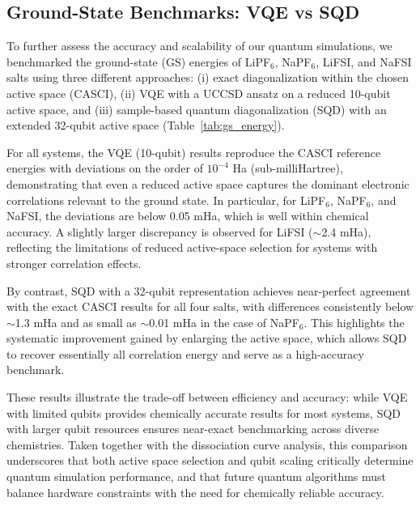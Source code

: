 \documentclass[num-refs]{wiley-article}
\begin{document}
\subsection{Ground-State Benchmarks: VQE vs SQD}

To further assess the accuracy and scalability of our quantum simulations, we benchmarked the ground-state (GS) energies of LiPF$_6$, NaPF$_6$, LiFSI, and NaFSI salts using three different approaches: (i) exact diagonalization within the chosen active space (CASCI), (ii) VQE with a UCCSD ansatz on a reduced 10-qubit active space, and (iii) sample-based quantum diagonalization (SQD) with an extended 32-qubit active space (Table~\ref{tab:gs_energy}).

For all systems, the VQE (10-qubit) results reproduce the CASCI reference energies with deviations on the order of $10^{-4}$ Ha (sub-milliHartree), demonstrating that even a reduced active space captures the dominant electronic correlations relevant to the ground state. In particular, for LiPF$_6$, NaPF$_6$, and NaFSI, the deviations are below 0.05 mHa, which is well within chemical accuracy. A slightly larger discrepancy is observed for LiFSI ($\sim$2.4 mHa), reflecting the limitations of reduced active-space selection for systems with stronger correlation effects.

By contrast, SQD with a 32-qubit representation achieves near-perfect agreement with the exact CASCI results for all four salts, with differences consistently below $\sim$1.3 mHa and as small as $\sim$0.01 mHa in the case of NaPF$_6$. This highlights the systematic improvement gained by enlarging the active space, which allows SQD to recover essentially all correlation energy and serve as a high-accuracy benchmark.

These results illustrate the trade-off between efficiency and accuracy: while VQE with limited qubits provides chemically accurate results for most systems, SQD with larger qubit resources ensures near-exact benchmarking across diverse chemistries. Taken together with the dissociation curve analysis, this comparison underscores that both active space selection and qubit scaling critically determine quantum simulation performance, and that future quantum algorithms must balance hardware constraints with the need for chemically reliable accuracy.
\end{document}
